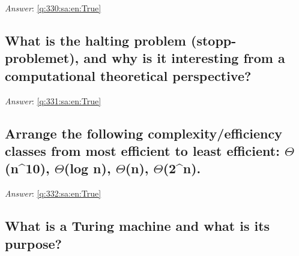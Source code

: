 \documentclass[a4paper,11pt,oneside]{article}
\begin{document}
\begin{sloppypar}
\label{q:330:sa:en:False}

\vspace{2cm}

\noindent\makebox[\textwidth]{\hrulefill}

\vspace{1cm}

\textit{Answer}: \autoref{q:330:sa:en:True}



\subsection{What is the halting problem (stopp-problemet), and why is it interesting from a computational theoretical perspective?}

\label{q:331:sa:en:False}

\vspace{2cm}

\noindent\makebox[\textwidth]{\hrulefill}

\vspace{1cm}

\textit{Answer}: \autoref{q:331:sa:en:True}



\subsection{Arrange the following complexity/efficiency classes from most efficient to least efficient: \ensuremath{\Theta}(n^10), \ensuremath{\Theta}(log n), \ensuremath{\Theta}(n), \ensuremath{\Theta}(2^n).}

\label{q:332:sa:en:False}

\vspace{2cm}

\noindent\makebox[\textwidth]{\hrulefill}

\vspace{1cm}

\textit{Answer}: \autoref{q:332:sa:en:True}



\subsection{What is a Turing machine and what is its purpose?}

\label{q:333:sa:en:False}

\vspace{2cm}

\noindent\makebox[\textwidth]{\hrulefill}


\end{sloppypar}
\end{document}
